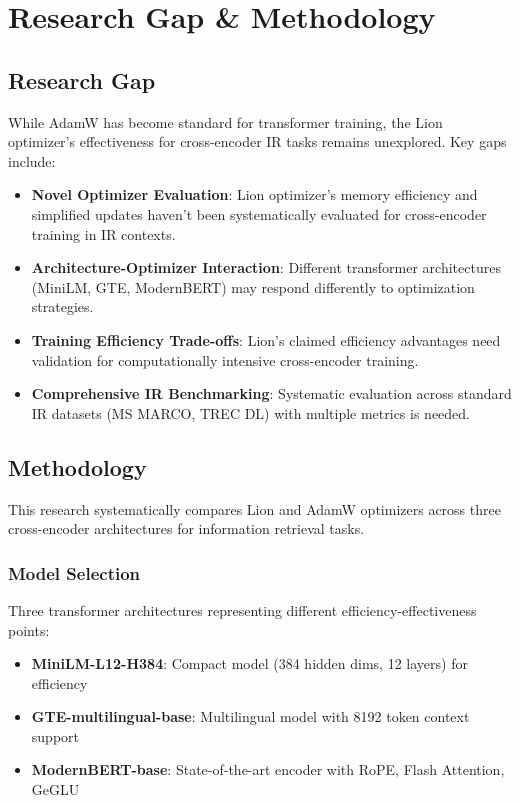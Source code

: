 
\chapter{Research Gap \& Methodology} %

\label{Chapter3} %

\section{Research Gap}

While AdamW has become standard for transformer training, the Lion optimizer's effectiveness for cross-encoder IR tasks remains unexplored. Key gaps include:

\begin{itemize}
    \item \textbf{Novel Optimizer Evaluation}: Lion optimizer's memory efficiency and simplified updates haven't been systematically evaluated for cross-encoder training in IR contexts.
    \item \textbf{Architecture-Optimizer Interaction}: Different transformer architectures (MiniLM, GTE, ModernBERT) may respond differently to optimization strategies.
    \item \textbf{Training Efficiency Trade-offs}: Lion's claimed efficiency advantages need validation for computationally intensive cross-encoder training.
    \item \textbf{Comprehensive IR Benchmarking}: Systematic evaluation across standard IR datasets (MS MARCO, TREC DL) with multiple metrics is needed.
\end{itemize}

\section{Methodology}

This research systematically compares Lion and AdamW optimizers across three cross-encoder architectures for information retrieval tasks.

\subsection{Model Selection}
Three transformer architectures representing different efficiency-effectiveness points:
\begin{itemize}
    \item \textbf{MiniLM-L12-H384}: Compact model (384 hidden dims, 12 layers) for efficiency
    \item \textbf{GTE-multilingual-base}: Multilingual model with 8192 token context support
    \item \textbf{ModernBERT-base}: State-of-the-art encoder with RoPE, Flash Attention, GeGLU
\end{itemize}

